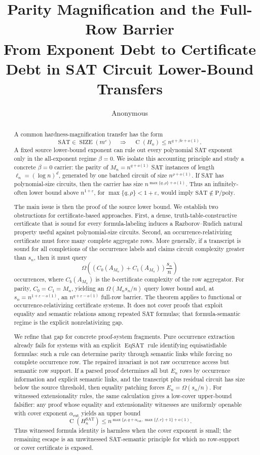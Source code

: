 \documentclass[11pt]{article}
\title{Parity Magnification and the Full-Row Barrier\\
\large From Exponent Debt to Certificate Debt in SAT Circuit Lower-Bound Transfers}
\author{Anonymous}
\date{}
\theoremstyle{definition}
\newcommand{\SIZE}{\operatorname{SIZE}}
\newcommand{\Ckt}{\operatorname{C}}
\newcommand{\SAT}{\mathrm{SAT}}
\newcommand{\Ppoly}{\mathrm{P/poly}}
\newcommand{\eps}{\varepsilon}
\newcommand{\EqSAT}{\operatorname{EqSAT}}
\begin{document}
\maketitle

\begin{abstract}
A common hardness-magnification transfer has the form
\[
  \SAT\in\SIZE(m^c)\quad\Longrightarrow\quad
  \Ckt(H_n)\le n^{q+\beta c+o(1)}.
\]
A fixed source lower-bound exponent can rule out every polynomial SAT exponent only in the all-exponent regime $\beta=0$. We isolate this accounting principle and study a concrete $\beta=0$ carrier: the parity of $M_n=n^{q+o(1)}$ SAT instances of length $\ell_n=(\log n)^d$, generated by one batched circuit of size $n^{\rho+o(1)}$. If SAT has polynomial-size circuits, then the carrier has size $n^{\max\{q,\rho\}+o(1)}$. Thus an infinitely-often lower bound above $n^{1+\eps}$, for $\max\{q,\rho\}<1+\eps$, would imply $\SAT\notin\Ppoly$.

The main issue is then the proof of the source lower bound. We establish two obstructions for certificate-based approaches. First, a dense, truth-table-constructive certificate that is sound for every formula-labeling induces a Razborov--Rudich natural property useful against polynomial-size circuits. Second, an occurrence-relativizing certificate must force many complete aggregate rows. More generally, if a transcript is sound for all completions of the occurrence labels and claims circuit complexity greater than $s_n$, then it must query
\[
  \Omega\!\left((C_0(A_{M_n})+C_1(A_{M_n}))\frac{s_n}{n}\right)
\]
occurrences, where $C_b(A_{M_n})$ is the $b$-certificate complexity of the row aggregator. For parity, $C_0=C_1=M_n$, yielding an $\Omega(M_ns_n/n)$ query lower bound and, at $s_n=n^{1+\eps-o(1)}$, an $n^{q+\eps-o(1)}$ full-row barrier. The theorem applies to functional or occurrence-relativizing certificate systems. It does not cover proofs that exploit equality and semantic relations among repeated SAT formulas; that formula-semantic regime is the explicit nonrelativizing gap.

We refine that gap for concrete proof-system fragments. Pure occurrence extraction already fails for systems with an explicit $\EqSAT$ rule identifying equisatisfiable formulas: such a rule can determine parity through semantic links while forcing no complete occurrence row. The repaired invariant is not raw occurrence access but semantic row support. If a parsed proof determines all but $E_n$ rows by occurrence information and explicit semantic links, and the transcript plus residual circuit has size below the source threshold, then equality patching forces $E_n=\Omega(s_n/n)$. For witnessed extensionality rules, the same calculation gives a low-cover upper-bound falsifier: any proof whose equality and extensionality witnesses are uniformly openable with cover exponent $\alpha_{\mathrm{ext}}$ yields an upper bound
\[
  \Ckt(H_n^{\SAT})
  \le n^{\max\{\rho,q+\alpha_{\mathrm{ext}},\max\{f,r\}+1\}+o(1)}.
\]
Thus witnessed formula identity is harmless when the cover exponent is small; the remaining escape is an unwitnessed SAT-semantic principle for which no row-support or cover certificate is exposed.
\end{abstract}
\end{document}

